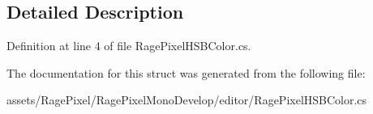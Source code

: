 \subsection{Detailed Description}


Definition at line 4 of file Rage\-Pixel\-H\-S\-B\-Color.\-cs.



The documentation for this struct was generated from the following file\-:\begin{DoxyCompactItemize}
\item 
assets/\-Rage\-Pixel/\-Rage\-Pixel\-Mono\-Develop/editor/Rage\-Pixel\-H\-S\-B\-Color.\-cs\end{DoxyCompactItemize}
